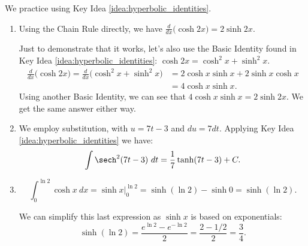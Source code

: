 We practice using Key Idea \ref{idea:hyperbolic_identities}.\\

{\begin{enumerate}
\item		Using the Chain Rule directly, we have $\frac{d}{dx} \big(\cosh 2x\big) = 2\sinh 2x$.

Just to demonstrate that it works, let's also use the Basic Identity found in Key Idea \ref{idea:hyperbolic_identities}: $\cosh 2x = \cosh^2x+\sinh^2x$.
\begin{align*}\frac{d}{dx}\big(\cosh 2x\big) = \frac{d}{dx}\big(\cosh^2x+\sinh^2x\big) &= 2\cosh x\sinh x+ 2\sinh x\cosh x\\ &= 4\cosh x\sinh x.
\end{align*}
Using another Basic Identity, we can see that $4\cosh x\sinh x = 2\sinh 2x$. We get the same answer either way.

\item	  We employ substitution, with $u = 7t-3$ and $du = 7dt$. Applying Key Idea
\ref{idea:hyperbolic_identities} we have:
$$ \int \sech^2 (7t-3)\ dt = \frac17\tanh (7t-3) + C.$$

\item		$$\int_0^{\ln 2} \cosh x\ dx = \sinh x\Big|_0^{\ln 2} = \sinh (\ln 2) - \sinh 0 = \sinh(\ln 2).$$

We can simplify this last expression as $\sinh x$ is based on exponentials:
$$\sinh(\ln 2) = \frac{e^{\ln 2}-e^{-\ln 2}}2 = \frac{2-1/2}{2} = \frac34.$$
\end{enumerate}
\baselineskip
}\\

